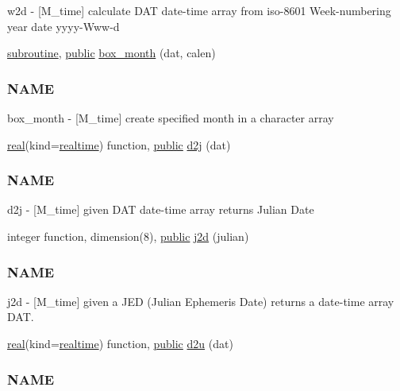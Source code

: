 \begin{DoxyCompactItemize}
\begin{DoxyCompactList}
w2d -\/ \mbox{[}M\+\_\+time\mbox{]} calculate D\+AT date-\/time array from iso-\/8601 Week-\/numbering year date yyyy-\/\+Www-\/d \end{DoxyCompactList}\item 
\hyperlink{M__stopwatch_83_8txt_acfbcff50169d691ff02d4a123ed70482}{subroutine}, \hyperlink{M__stopwatch_83_8txt_a2f74811300c361e53b430611a7d1769f}{public} \hyperlink{namespacem__time_a0fe7540912df30d3578f3c469413aea8}{box\+\_\+month} (dat, calen)
\begin{DoxyCompactList}\small\item\em \subsubsection*{N\+A\+ME}

box\+\_\+month -\/ \mbox{[}M\+\_\+time\mbox{]} create specified month in a character array \end{DoxyCompactList}\item 
\hyperlink{read__watch_83_8txt_abdb62bde002f38ef75f810d3a905a823}{real}(kind=\hyperlink{namespacem__time_ac10ea9e8d59ec74eaa7d89f2517d7422}{realtime}) function, \hyperlink{M__stopwatch_83_8txt_a2f74811300c361e53b430611a7d1769f}{public} \hyperlink{namespacem__time_a3fccc53c2650104eff084c7998d18f54}{d2j} (dat)
\begin{DoxyCompactList}\small\item\em \subsubsection*{N\+A\+ME}

d2j -\/ \mbox{[}M\+\_\+time\mbox{]} given D\+AT date-\/time array returns Julian Date \end{DoxyCompactList}\item 
integer function, dimension(8), \hyperlink{M__stopwatch_83_8txt_a2f74811300c361e53b430611a7d1769f}{public} \hyperlink{namespacem__time_a3ad5cad6df02c53e0429c3602a072e3c}{j2d} (julian)
\begin{DoxyCompactList}\small\item\em \subsubsection*{N\+A\+ME}

j2d -\/ \mbox{[}M\+\_\+time\mbox{]} given a J\+ED (Julian Ephemeris Date) returns a date-\/time array D\+AT. \end{DoxyCompactList}\item 
\hyperlink{read__watch_83_8txt_abdb62bde002f38ef75f810d3a905a823}{real}(kind=\hyperlink{namespacem__time_ac10ea9e8d59ec74eaa7d89f2517d7422}{realtime}) function, \hyperlink{M__stopwatch_83_8txt_a2f74811300c361e53b430611a7d1769f}{public} \hyperlink{namespacem__time_a1506e2889a156387df4481ed0534be81}{d2u} (dat)
\begin{DoxyCompactList}\small\item\em \subsubsection*{N\+A\+ME}


\end{DoxyCompactList}
\end{DoxyCompactItemize}
